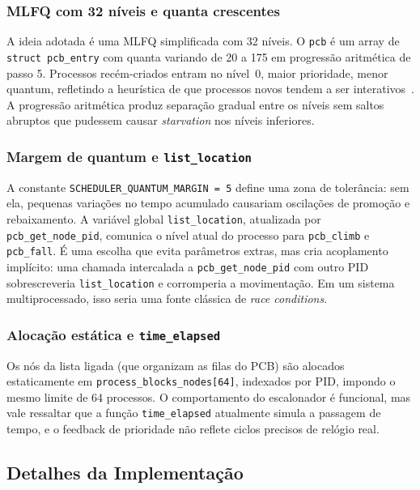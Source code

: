 \subsubsection{MLFQ com 32 níveis e quanta crescentes}

A ideia adotada é uma MLFQ simplificada com 32 níveis. O \texttt{pcb}
é um array de \texttt{struct pcb\_entry} com quanta variando de 20 a 175
em progressão aritmética de passo 5. Processos recém-criados entram no
nível~0, maior prioridade, menor quantum, refletindo a heurística de que
processos novos tendem a ser interativos~\cite{tanenbaum2015}. A progressão
aritmética produz separação gradual entre os níveis sem saltos abruptos que
pudessem causar \emph{starvation} nos níveis inferiores.

\subsubsection{Margem de quantum e \texttt{list\_location}}

A constante \texttt{SCHEDULER\_QUANTUM\_MARGIN = 5} define uma zona de
tolerância: sem ela, pequenas variações no tempo acumulado causariam
oscilações de promoção e rebaixamento. A variável global \texttt{list\_location}, atualizada por
\texttt{pcb\_get\_node\_pid}, comunica o nível atual
do processo para \texttt{pcb\_climb} e \texttt{pcb\_fall}. É uma escolha que evita parâmetros extras, mas cria acoplamento implícito:
uma chamada intercalada a \texttt{pcb\_get\_node\_pid} com outro PID
sobrescreveria \texttt{list\_location} e corromperia a movimentação. Em um
sistema multiprocessado, isso seria uma fonte clássica de \emph{race conditions}.

\subsubsection{Alocação estática e \texttt{time\_elapsed}}

Os nós da lista ligada (que organizam as filas do PCB) são alocados estaticamente em
\texttt{process\_blocks\_nodes[64]}, indexados por PID, impondo o mesmo
limite de 64 processos. O comportamento do escalonador é
funcional, mas vale ressaltar que a função \texttt{time\_elapsed} atualmente simula a 
passagem de tempo, e o feedback de prioridade não reflete ciclos precisos de relógio real.

\subsection{Detalhes da Implementação}

